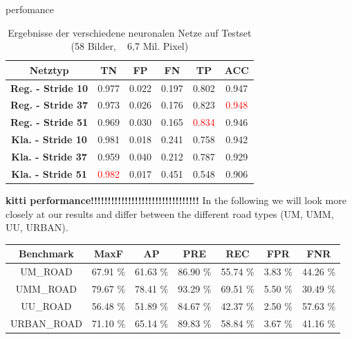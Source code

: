 perfomance
      \begin{table}[h!]
  \begin{center}
    \label{tab:table1}
    \begin{tabular}{c|ccccc}
    \toprule
      \textbf{Netztyp} & \textbf{TN} & \textbf{FP} & \textbf{FN} & \textbf{TP} & \textbf{ACC} \\
       \midrule
      \textbf{Reg. - Stride 10} & 0.977 & 0.022 & 0.197 & 0.802 & 0.947\\
      \textbf{Reg. - Stride 37} & 0.973 & 0.026 & 0.176 & 0.823 &  \textcolor{red}{0.948}\\ 
      \textbf{Reg. - Stride 51} & 0.969 & 0.030 & 0.165 & \textcolor{red}{0.834} & 0.946\\
      \midrule
      \textbf{Kla. - Stride 10} & 0.981 & 0.018 & 0.241 & 0.758 & 0.942\\
      \textbf{Kla. - Stride 37} & 0.959 & 0.040 & 0.212 & 0.787 & 0.929\\
      \textbf{Kla. - Stride 51} & \textcolor{red}{0.982} & 0.017 & 0.451 & 0.548 & 0.906\\
      \bottomrule
    \end{tabular}
    \caption{Ergebnisse der verschiedene neuronalen Netze auf Testset (58 Bilder, ~ 6,7 Mil. Pixel)}
  \end{center}
\end{table}

\textbf{kitti performance!!!!!!!!!!!!!!!!!!!!!!!!!!!!!!!!}
In the following we will look more closely at our results and differ between the different road types (UM, UMM, UU, URBAN).

      \begin{table}[h!]
  \begin{center}
\begin{tabular}{c | c | c | c | c | c | c}
 {\bf Benchmark} & {\bf MaxF} & {\bf AP} & {\bf PRE} & {\bf REC} & {\bf FPR} & {\bf FNR}\\ \hline
UM\_ROAD & 67.91 \% & 61.63 \% & 86.90 \% & 55.74 \% & 3.83 \% & 44.26 \%\\
UMM\_ROAD & 79.67 \% & 78.41 \% & 93.29 \% & 69.51 \% & 5.50 \% & 30.49 \%\\
UU\_ROAD & 56.48 \% & 51.89 \% & 84.67 \% & 42.37 \% & 2.50 \% & 57.63 \%\\
URBAN\_ROAD & 71.10 \% & 65.14 \% & 89.83 \% & 58.84 \% & 3.67 \% & 41.16 \%\\
\end{tabular}
  \end{center}
\end{table}

